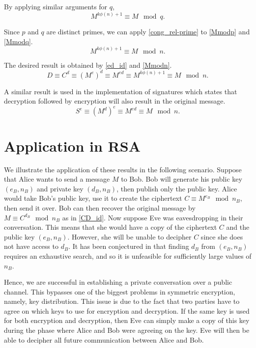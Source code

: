 \documentclass[10pt]{article}
\begin{document}
\noindent By applying similar arguments for $q$,
\begin{equation}
    \label{Mmodq}
    M^{k \phi(n) + 1} \equiv M \mod q.
\end{equation}

\noindent Since $p$ and $q$ are distinct primes, we can apply \ref{cong_rel-prime} to \ref{Mmodp} and \ref{Mmodq}.
\begin{equation}
    \label{Mmodn}
    M^{k \phi(n) + 1} \equiv M \mod n.
\end{equation}

\noindent The desired result is obtained by \ref{ed_id} and \ref{Mmodn}.
\begin{equation}
    \label{CD_id}
    D \equiv C^d \equiv (M^e)^d  \equiv M^{e d} \equiv M^{k \phi(n) + 1} \equiv M \mod n.
\end{equation}

\noindent A similar result is used in the implementation of signatures which states that decryption followed by encryption will also result in the original message.
\begin{equation}
    \label{SE_id}
    S^e \equiv (M^d)^e \equiv M^{e d} \equiv M \mod n.
\end{equation}


\section{Application in RSA}
We illustrate the application of these results in the following scenario. Suppose that Alice wants to send a message $M$ to Bob. Bob will generate his public key $(e_B, n_B)$ and private key $(d_B, n_B)$, then publish only the public key. Alice would take Bob’s public key, use it to create the ciphertext $C \equiv M^{e_B} \mod n_B$, then send it over. Bob can then recover the original message by $M \equiv C^{d_B} \mod n_B$ as in \ref{CD_id}. Now suppose Eve was eavesdropping in their conversation. This means that she would have a copy of the ciphertext $C$ and the public key $(e_B, n_B)$. However, she will be unable to decipher $C$ since she does not have access to $d_B$. It has been conjectured in \cite{rivest1978method} that finding $d_B$ from $(e_B, n_B)$ requires an exhaustive search, and so it is unfeasible for sufficiently large values of $n_B$.

Hence, we are successful in establishing a private conversation over a public channel. This bypasses one of the biggest problems in symmetric encryption, namely, key distribution. This issue is due to the fact that two parties have to agree on which keys to use for encryption and decryption. If the same key is used for both encryption and decryption, then Eve can simply make a copy of this key during the phase where Alice and Bob were agreeing on the key. Eve will then be able to decipher all future communication between Alice and Bob.
\end{document}
